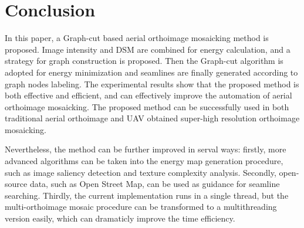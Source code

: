 \documentclass[journal]{IEEEtran}
\begin{document}
\section{Conclusion}
In this paper, a Graph-cut based aerial orthoimage mosaicking method is proposed. Image intensity and DSM are combined for energy calculation, and a strategy for graph construction is proposed. Then the Graph-cut algorithm is adopted for energy minimization and seamlines are finally generated according to graph nodes labeling. The experimental results show that the proposed method is both effective and efficient, and can effectively improve the automation of aerial orthoimage mosaicking. The proposed method can be successfully used in both traditional aerial orthoimage and UAV obtained super-high resolution orthoimage mosaicking. 

Nevertheless, the method can be further improved in serval ways: firstly, more advanced algorithms can be taken into the energy map generation procedure, such as image saliency detection and texture complexity analysis. Secondly, open-source data, such as Open Street Map, can be used as guidance for seamline searching. Thirdly, the current implementation runs in a single thread, but the multi-orthoimage mosaic procedure can be transformed to a multithreading version easily, which can dramaticly improve the time efficiency.

\ifCLASSOPTIONcaptionsoff
  \newpage
\fi

{
\small


}
\end{document}
